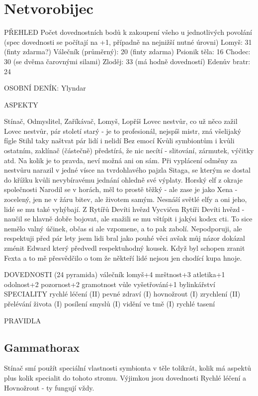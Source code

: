 \documentclass[../main.tex]{subfiles}
\begin{document}
\section{Netvorobijec}
\label{sec:netvorobijec}

PŘEHLED
Počet dovednostních bodů k zakoupení všeho u jednotlivých povolání (spec dovednosti se počítají na +1, případně na nejnižší nutné úrovni)
Lomyš: 31 (finty zdarma?)
Válečník (průměrný): 20 (finty zdarma)
Psionik těla: 16
Chodec: 30 (se dvěma čarovnými silami)
Zloděj: 33 (má hodně dovedností)
Edenův bratr: 24 


OSOBNÍ DENÍK: Ylyndar

ASPEKTY

Stínač, Odmyslitel, Zaříkávač, Lomyš, Lopříš
Lovec nestvůr, co už něco zažil
Lovec nestvůr, pár století starý - je to profesionál, nejspíš mistr, zná všelijaký fígle
Stihl taky naštvat pár lidí i nelidí
Bez emocí
Kvůli symbiontům i kvůli ostatním, zaklínač (částečně) předstírá, že nic necítí - slitování, zármutek, výčitky atd. Na kolik je to pravda, neví možná ani on sám. Při vyplácení odměny za nestvůru narazil v jedné vísce na tvrdohlavého pajzla Sitaga, se kterým se dostal do křížku kvůli nevybíravému jednání ohledně své výplaty.
Horský elf z okraje společnosti
Narodil se v horách, měl to prostě těžký - ale zase je jako Xena - zocelený, jen ne v žáru bitev, ale životem samým. Nesnáší světlé elfy a oni jeho, lidé se mu také vyhýbají.
Z Rytířů Devíti hvězd
Vycvičen Rytíři Devíti hvězd - naučil se hlavně dobře bojovat, ale snažili se mu vštípit i jakýsi kodex cti. To sice nemělo valný účinek, občas si ale vzpomene, a to pak zabolí.
Nepodporuji, ale respektuji
před pár lety jsem lidi bral jako pouhé věci avšak můj názor dokázal zménit Edward který předvedl respektuhodný kousek. Když byl schopen zranit Fexta a to mě přesvědčilo o tom že někteří lidé nejsou jen chodící kupa hnoje.


DOVEDNOSTI (24 pyramida)
válečník lomyš+4
mrštnost+3
atletika+1
odolnost+2
pozornost+2
gramotnost
vůle
vyšetřování+1
bylinkářství
SPECIALITY
rychlé léčení (II)
pevné zdraví (I)
hovnožrout (I)
zrychlení (II)
přelévání života (I)
posílení smyslů (I)
vidění ve tmě (I)
rychlé tasení


PRAVIDLA

\subsection{Gammathorax}
\label{sec:lopr-gamma}

Stínač smí použít speciální vlastnosti symbionta v těle tolikrát, kolik má aspektů plus kolik specialit do tohoto stromu. Výjimkou jsou dovednosti Rychlé léčení a Hovnožrout - ty fungují vždy.\\
\end{document}
